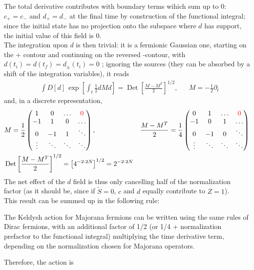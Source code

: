 \documentclass[a4paper,11pt]{article}
\DeclareMathOperator{\Det}{Det}
\theoremstyle{remark}
\newcommand*{\mathcolor}{}  %
\def\mathcolor#1#{\mathcoloraux{#1}}
\newcommand*{\mathcoloraux}[3]{%
  \protect\leavevmode
  \begingroup
    \color#1{#2}#3%
  \endgroup
}
\begin{document}
   The total derivative contributes with boundary terms wihich sum up to 0: $c_+=c_-$ and $d_+=d_-$ at the final time by construction of the functional integral; since the initial state has no projection onto the subspace where $d$ has support, the initial value of this field is 0.\\
   The integration upon $d$ is then trivial: it is a fermionic Gaussian one, starting on the + contour and continuing on the reversed -contour, with $d(t_i)=d(t_f)=d_{\pm}(t_i)=0$ ; ignoring the sources (they can be absorbed by a shift of the integration variables), it reads 
   \begin{align*}
   &\int D[d]\,\exp\left[\int_t \frac{1}{2}dMd\right] = \Det\left[\frac{M-M^T}{2}\right]^{1/2}, & &M=-\frac{1}{2}\partial_t
   \end{align*}
   and, in a discrete representation,
   \begin{align*}
    &M = \frac{1}{2}\begin{pmatrix}
                     1 & 0 & \hdots & \mathcolor{red}{0} \\ -1 & 1 & 0 &\hdots \\ 0 & -1 & 1 & \ddots \\ \vdots & \ddots  & \ddots & \ddots 
                    \end{pmatrix}, 
    & & \frac{M-M^T}{2} = \frac{1}{4}\begin{pmatrix}
                     0 & 1 & \hdots & \mathcolor{red}{0} \\ -1 & 0 & 1 &\hdots \\ 0 & -1 & 0 & \ddots \\ \vdots & \ddots  & \ddots & \ddots 
                    \end{pmatrix}\\
    & \Det\left[\frac{M-M^T}{2}\right]^{1/2} = \left[4^{-2\cdot2N}\right]^{1/2} = 2^{-2\cdot2N}
   \end{align*}
   The net effect of the $d$ field is thus only cancelling half of the normalization factor (as it should be, since if $\tilde{S}=0$,  $c$ and $d$ equally contribute to $Z=1$). \\[0.3cm] This result can be summed up in the following rule:  \begin{framed}The Keldysh action for Majorana fermions can be written using the same rules of Dirac fermions, with an additional factor of 1/2 (or 1/4 + normalization prefactor to the functional integral) multiplying the time derivative term, depending on the normalization chosen for Majorana operators.\end{framed} Therefore, the action is 
\end{document}

